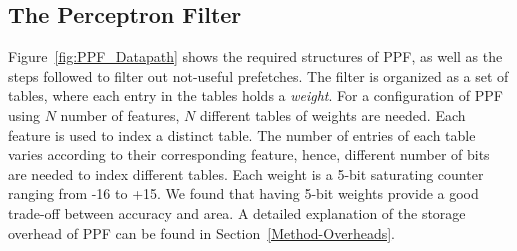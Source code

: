 \subsection{The Perceptron Filter}
\label{Arch-Perceptron}

Figure~\ref{fig:PPF_Datapath} shows the required structures of PPF, as well as
the steps followed to filter out not-useful prefetches. The filter is
organized as a set of tables, where each entry in the tables holds a
\textit{weight}. For a configuration of PPF using $N$ number of features, $N$
different tables of weights are needed. Each feature is used to index a
distinct table. The number of entries of each table varies according to their
corresponding feature, hence, different number of bits are needed to index
different tables. Each weight is a 5-bit saturating counter ranging from -16
to +15. We found that having 5-bit weights provide a good trade-off between
accuracy and area. A detailed explanation of the storage overhead of PPF can
be found in Section~\ref{Method-Overheads}.\\

